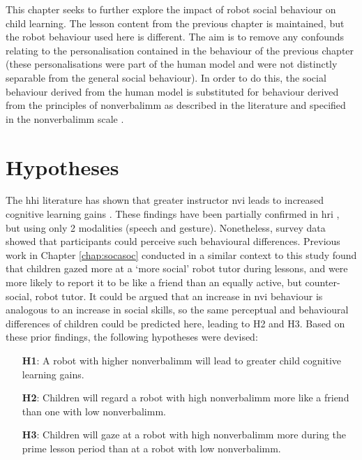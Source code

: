 This chapter seeks to further explore the impact of robot social behaviour on child \gls{learning}. The lesson content from the previous chapter is maintained, but the robot behaviour used here is different. The aim is to remove any confounds relating to the personalisation contained in the behaviour of the previous chapter (these personalisations were part of the human model and were not distinctly separable from the general social behaviour). In order to do this, the social behaviour derived from the human model is substituted for behaviour derived from the principles of \gls{nonverbalimm} as described in the literature and specified in the \gls{nonverbalimm} scale \citep{richmond1998nonverbal}.

\section{Hypotheses} \label{sec:meth-hyp}
The \acrshort{hhi} literature has shown that greater instructor \acrshort{nvi} leads to increased cognitive \gls{learning} gains \citep{witt2004meta}. These findings have been partially confirmed in \acrshort{hri} \citep{szafir2012pay}, but using only 2 modalities (speech and gesture). Nonetheless, survey data showed that participants could perceive such behavioural differences. Previous work in Chapter \ref{chap:socasoc} conducted in a similar context to this study found that children gazed more at a `more social' robot tutor during lessons, and were more likely to report it to be like a friend than an equally active, but counter-social, robot tutor. It could be argued that an increase in \acrshort{nvi} behaviour is analogous to an increase in social skills, so the same perceptual and behavioural differences of children could be predicted here, leading to H2 and H3. Based on these prior findings, the following hypotheses were devised:

\begin{enumerate}
\item [\textbf{H1}:] A robot with higher \gls{nonverbalimm} will lead to greater child cognitive \gls{learning} gains.
\item [\textbf{H2}:] Children will regard a robot with high \gls{nonverbalimm} more like a friend than one with low \gls{nonverbalimm}.
\item [\textbf{H3}:] Children will gaze at a robot with high \gls{nonverbalimm} more during the prime lesson period than at a robot with low \gls{nonverbalimm}.
\end{enumerate}

